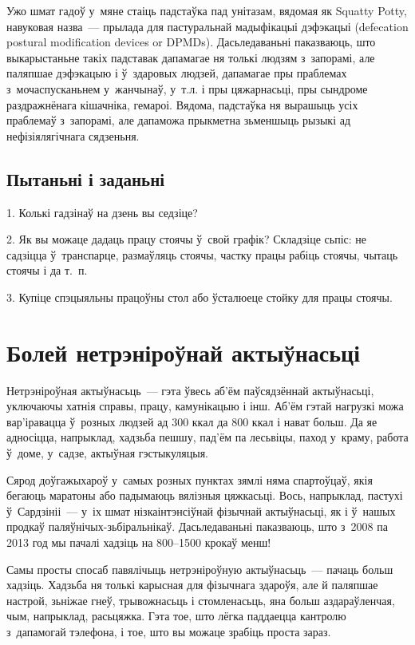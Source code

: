 Ужо шмат гадоў у~мяне стаіць падстаўка пад унітазам, вядомая як Squatty Potty, навуковая назва~--- прылада для пастуральнай мадыфікацыі дэфэкацыі (defecation postural modification devices or DPMDs). Дасьледаваньні паказваюць, што выкарыстаньне такіх падставак дапамагае ня толькі людзям з~запорамі, але паляпшае дэфэкацыю і ў~здаровых людзей, дапамагае пры праблемах з~мочаспусканьнем у~жанчынаў, у~т.л. і пры цяжарнасьці, пры сындроме раздражнёнага кішачніка, гемароі. Вядома, падстаўка ня вырашыць усіх праблемаў з~запорамі, але дапаможа прыкметна зьменшыць рызыкі ад нефізіялягічнага сядзеньня.

\subsection*{Пытаньні і заданьні}

1. Колькі гадзінаў на дзень вы седзіце?

2. Як вы можаце дадаць працу стоячы ў~свой графік? Складзіце сьпіс: не садзіцца ў~транспарце, размаўляць стоячы, частку працы рабіць стоячы, чытаць стоячы і да т.~п.

3. Купіце спэцыяльны працоўны стол або ўсталюеце стойку для працы стоячы.


\section{Болей нетрэніроўнай актыўнасьці}

Нетрэніроўная актыўнасьць~--- гэта ўвесь аб'ём паўсядзённай актыўнасьці, уключаючы хатнія справы, працу, камунікацыю і інш. Аб'ём гэтай нагрузкі можа вар'іравацца ў~розных людзей ад 300 ккал да 800 ккал і нават больш. Да яе адносіцца, напрыклад, хадзьба пешшу, пад'ём па лесьвіцы, паход у~краму, работа ў~доме, у~садзе, актыўная гэстыкуляцыя.

Сярод доўгажыхароў у~самых розных пунктах зямлі няма спартоўцаў, якія бегаюць маратоны або падымаюць вялізныя цяжкасьці. Вось, напрыклад, пастухі ў~Сардзініі~--- у~іх шмат нізкаінтэнсіўнай фізычнай актыўнасьці, як і ў~нашых продкаў паляўнічых-зьбіральнікаў. Дасьледаваньні паказваюць, што з~2008 па 2013 год мы пачалі хадзіць на 800--1500 крокаў менш!

Самы просты спосаб павялічыць нетрэніроўную актыўнасьць~--- пачаць больш хадзіць. Хадзьба ня толькі карысная для фізычнага здароўя, але й паляпшае настрой, зьніжае гнеў, трывожнасьць і стомленасьць, яна больш аздараўленчая, чым, напрыклад, расьцяжка. Гэта тое, што лёгка паддаецца кантролю з~дапамогай тэлефона, і тое, што вы можаце зрабіць проста зараз.

